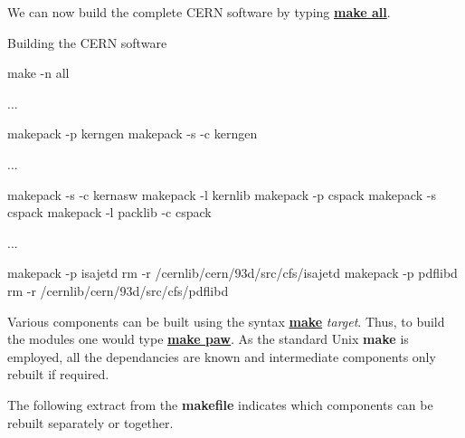 We can now build the complete CERN software by typing {\underline {\bf make all}}.

\begin{XMPt}{Building the CERN software}

   make -n all

   ...

	makepack -p kerngen
	makepack -s -c kerngen

   ...

	makepack -s -c kernasw
	makepack -l kernlib
	makepack -p cspack
	makepack -s cspack
	makepack -l packlib -c cspack

   ...

	makepack -p isajetd
	rm -r /cernlib/cern/93d/src/cfs/isajetd
	makepack -p pdflibd
	rm -r /cernlib/cern/93d/src/cfs/pdflibd

\end{XMPt}

Various components can be built using the syntax {\underline {\bf make} {\it target}}.
Thus, to build the \PAW{} modules one would type {\underline {\bf make paw}}.
As the standard Unix {\bf make} is employed, all the dependancies are known
and intermediate components only rebuilt if required.

The following extract from the {\bf makefile} indicates which components can
be rebuilt separately or together.


